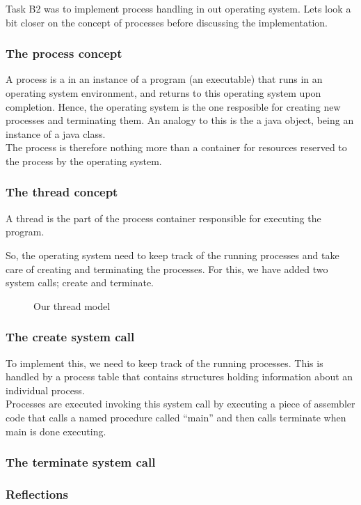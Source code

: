 Task B2 was to implement process handling in out operating system. Lets look a bit closer on the concept of processes before discussing the implementation.
\subsubsection{The process concept}
A process is a in an instance of a program (an executable) that runs in an operating system environment, 
and returns to this operating system upon completion. Hence, the operating system is the one resposible for 
creating new processes and terminating them. An analogy to this is the a java object, being an instance of a java class.\\
The process is therefore nothing more than a container for resources reserved to the process by the operating system. \\

\subsubsection{The thread concept}
A thread is the part of the process container responsible for executing the program.

So, the operating system need to keep track of the running processes and take care of creating and terminating the processes. 
For this, we have added two system calls; create and terminate.

\begin{figure}
\centering
{}
\caption{Our thread model}
\end{figure}

\subsubsection*{The create system call}
To implement this, we need to keep track of the running processes. This is handled by a process table that contains structures holding information about an individual process. \\
Processes are executed invoking this system call by executing a piece of assembler code that calls a named procedure called ``main'' and then calls terminate when main is done executing.
\subsubsection*{The terminate system call}


\subsubsection{Reflections}


